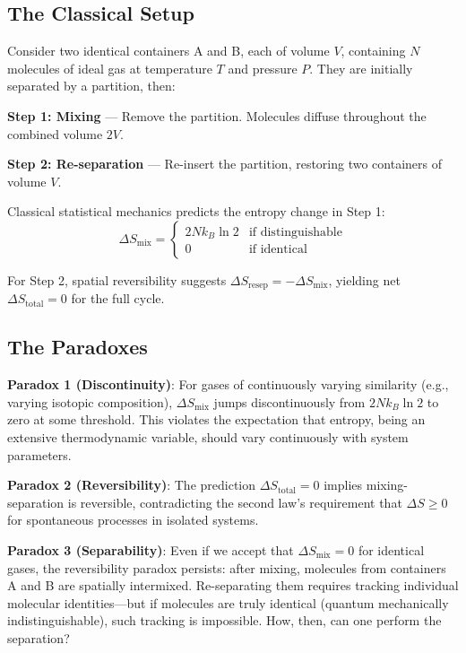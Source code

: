 \documentclass[superscriptaddress,prb,10pt]{revtex4-2}
\theoremstyle{definition}
\theoremstyle{remark}
\begin{document}
\subsection{The Classical Setup}

Consider two identical containers A and B, each of volume $V$, containing $N$ molecules of ideal gas at temperature $T$ and pressure $P$. They are initially separated by a partition, then:

\textbf{Step 1: Mixing} — Remove the partition. Molecules diffuse throughout the combined volume $2V$.

\textbf{Step 2: Re-separation} — Re-insert the partition, restoring two containers of volume $V$.

Classical statistical mechanics predicts the entropy change in Step 1:
\begin{equation}
\Delta S_{\text{mix}} =
\begin{cases}
2Nk_B \ln 2 & \text{if distinguishable} \\
0 & \text{if identical}
\end{cases}
\label{eq:classical_mixing}
\end{equation}

For Step 2, spatial reversibility suggests $\Delta S_{\text{resep}} = -\Delta S_{\text{mix}}$, yielding net $\Delta S_{\text{total}} = 0$ for the full cycle.

\subsection{The Paradoxes}

\textbf{Paradox 1 (Discontinuity)}: For gases of continuously varying similarity (e.g., varying isotopic composition), $\Delta S_{\text{mix}}$ jumps discontinuously from $2Nk_B \ln 2$ to zero at some threshold. This violates the expectation that entropy, being an extensive thermodynamic variable, should vary continuously with system parameters.

\textbf{Paradox 2 (Reversibility)}: The prediction $\Delta S_{\text{total}} = 0$ implies mixing-separation is reversible, contradicting the second law's requirement that $\Delta S \geq 0$ for spontaneous processes in isolated systems.

\textbf{Paradox 3 (Separability)}: Even if we accept that $\Delta S_{\text{mix}} = 0$ for identical gases, the reversibility paradox persists: after mixing, molecules from containers A and B are spatially intermixed. Re-separating them requires tracking individual molecular identities—but if molecules are truly identical (quantum mechanically indistinguishable), such tracking is impossible. How, then, can one perform the separation?
\end{document}
